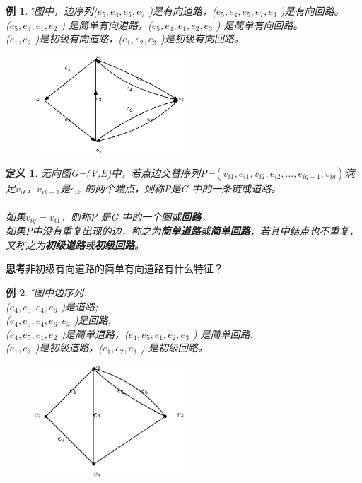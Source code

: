 \documentclass[11pt,a4paper,openany]{book}
\newtheorem{defination}{\textbf{定义}}[section]
\newtheorem{sample}{\textbf{例}}[section]
\begin{document}
\begin{sample}\H 下图中，边序列($e_5,e_4,e_5,e_7$ )是有向道路，($e_5,e_4,e_5,e_7,e_3$ )是有向回路。\\
($e_5,e_4,e_1,e_2$ ) 是简单有向道路，($e_5,e_4,e_1,e_2,e_3$ ) 是简单有向回路。\\
($e_1,e_2$ )是初级有向道路，($e_1,e_2,e_3$ )是初级有向回路。
\begin{figure}[H]
  \centering
  \includegraphics[width=0.5\textwidth]{2_1.eps}\\
\caption{}\label{fig:2.1}
\end{figure}
\end{sample}
\begin{defination}\K
无向图G=(V,E)中，若点边交替序列P=$(v_{i1},e_{i1},v_{i2},e_{i2},\dots,e_{iq-1},v_{iq} )$满足$v_{ik}$，$v_{ik+1}$是$e_{ik}$ 的两个端点，则称P是G 中的一条链或道路。\\
\\
如果$v_{iq}=v_{i1}$，则称P 是G 中的一个圈或\textbf{回路}。\\
\noindent 如果P中没有重复出现的边，称之为\textbf{简单道路}或\textbf{简单回路}，若其中结点也不重复，又称之为\textbf{初级道路}或\textbf{初级回路}。
\end{defination}
\textbf{思考}非初级有向道路的简单有向道路有什么特征？
\begin{sample}\H
下图中边序列:\\
($e_4,e_5,e_4,e_6$ )是道路;\\
($e_4,e_5,e_4,e_6,e_3$ )是回路;\\
($e_4,e_5,e_1,e_2$ )是简单道路，($e_4,e_5,e_1,e_2,e_3$ ) 是简单回路;\\
($e_1,e_2$ )是初级道路，($e_1,e_2,e_3$ ) 是初级回路。
\begin{figure}[H]
  \centering
  \includegraphics[width=0.5\textwidth]{2_2.eps}\\
\caption{}\label{fig:2.2}
\end{figure}
\end{sample}
\end{document}
